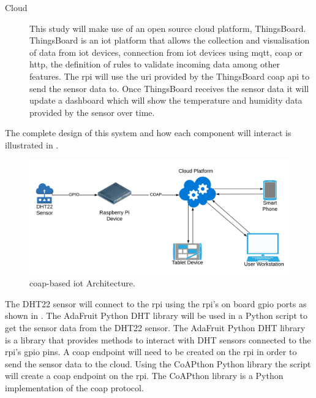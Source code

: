 \begin{description}
    \item[Cloud]
    This study will make use of an open source cloud platform, ThingsBoard.
    ThingsBoard is an \gls{iot} platform that allows the collection and 
    visualisation of data from \gls{iot} devices, connection from \gls{iot} devices
    using \gls{mqtt}, \gls{coap} or \gls{http}, the definition of rules to validate
    incoming data among other features. The \gls{rpi} will use the \gls{uri} 
    provided by the ThingsBoard \gls{coap} \gls{api} to send the sensor data to.
    Once ThingsBoard receives the sensor data it will update a dashboard which
    will show the temperature and humidity data provided by the sensor over time.

\end{description}

The complete design of this system and how each component will interact
is illustrated in .

\begin{figure}[H]
    \centering
    \includegraphics[width=\imageWidth\textwidth]{assets/Project_Framework.png}
    \caption{\label{fig:coap_iot_architecture} \gls{coap}-based \gls{iot} Architecture.}
\end{figure}


The DHT22 sensor will connect to the \gls{rpi} using the \gls{rpi}'s on board 
\gls{gpio} ports as shown in . 
The AdaFruit Python DHT library will be used in a Python script to get the 
sensor data from the DHT22 sensor.
The AdaFruit Python DHT library is a library that provides methods to interact 
with DHT sensors connected to the \gls{rpi}'s \gls{gpio} pins.
A \gls{coap} endpoint will need to be created on the \gls{rpi} in order to 
send the sensor data to the cloud. 
Using the CoAPthon Python library the script will create a \gls{coap} 
endpoint on the \gls{rpi}.
The CoAPthon library is a Python implementation of the \gls{coap} protocol.

